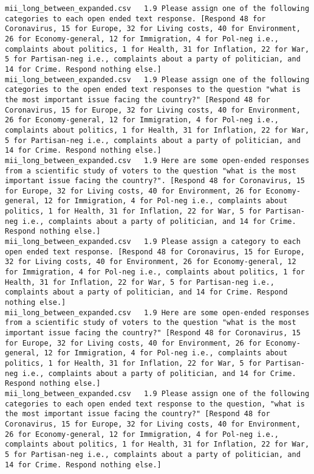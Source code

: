 \begin{lstlisting}[label=lst:promptvariants]
mii_long_between_expanded.csv	1.9	Please assign one of the following categories to each open ended text response. [Respond 48 for Coronavirus, 15 for Europe, 32 for Living costs, 40 for Environment, 26 for Economy-general, 12 for Immigration, 4 for Pol-neg i.e., complaints about politics, 1 for Health, 31 for Inflation, 22 for War, 5 for Partisan-neg i.e., complaints about a party of politician, and 14 for Crime. Respond nothing else.]
mii_long_between_expanded.csv	1.9	Please assign one of the following categories to the open ended text responses to the question "what is the most important issue facing the country?" [Respond 48 for Coronavirus, 15 for Europe, 32 for Living costs, 40 for Environment, 26 for Economy-general, 12 for Immigration, 4 for Pol-neg i.e., complaints about politics, 1 for Health, 31 for Inflation, 22 for War, 5 for Partisan-neg i.e., complaints about a party of politician, and 14 for Crime. Respond nothing else.]
mii_long_between_expanded.csv	1.9	Here are some open-ended responses from a scientific study of voters to the question "what is the most important issue facing the country?". [Respond 48 for Coronavirus, 15 for Europe, 32 for Living costs, 40 for Environment, 26 for Economy-general, 12 for Immigration, 4 for Pol-neg i.e., complaints about politics, 1 for Health, 31 for Inflation, 22 for War, 5 for Partisan-neg i.e., complaints about a party of politician, and 14 for Crime. Respond nothing else.]
mii_long_between_expanded.csv	1.9	Please assign a category to each open ended text response. [Respond 48 for Coronavirus, 15 for Europe, 32 for Living costs, 40 for Environment, 26 for Economy-general, 12 for Immigration, 4 for Pol-neg i.e., complaints about politics, 1 for Health, 31 for Inflation, 22 for War, 5 for Partisan-neg i.e., complaints about a party of politician, and 14 for Crime. Respond nothing else.]
mii_long_between_expanded.csv	1.9	Here are some open-ended responses from a scientific study of voters to the question "what is the most important issue facing the country?" [Respond 48 for Coronavirus, 15 for Europe, 32 for Living costs, 40 for Environment, 26 for Economy-general, 12 for Immigration, 4 for Pol-neg i.e., complaints about politics, 1 for Health, 31 for Inflation, 22 for War, 5 for Partisan-neg i.e., complaints about a party of politician, and 14 for Crime. Respond nothing else.]
mii_long_between_expanded.csv	1.9	Please assign one of the following categories to each open ended text response to the question, "what is the most important issue facing the country?" [Respond 48 for Coronavirus, 15 for Europe, 32 for Living costs, 40 for Environment, 26 for Economy-general, 12 for Immigration, 4 for Pol-neg i.e., complaints about politics, 1 for Health, 31 for Inflation, 22 for War, 5 for Partisan-neg i.e., complaints about a party of politician, and 14 for Crime. Respond nothing else.]

\end{lstlisting}
